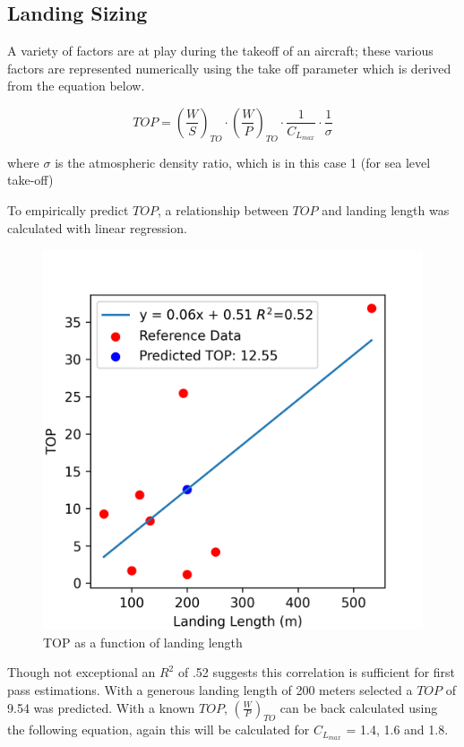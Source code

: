 \documentclass[12pt]{article}
\begin{document}
	\subsection{Landing Sizing}
	A variety of factors are at play during the takeoff of an aircraft; these various factors are represented numerically using the take off parameter which is derived from the equation below.
	
	\begin{equation}
		TOP = \left(\frac{W}{S}\right)_{TO} \cdot \left(\frac{W}{P}\right)_{TO} \cdot \frac{1}{C_{L_{max}}} \cdot \frac{1}{\sigma}
	\end{equation}
	
	where $\sigma$ is the atmospheric density ratio, which is in this case 1 (for sea level take-off) 
	
	To empirically predict $TOP$, a relationship between $TOP$ and landing length was calculated with linear regression.
	
	\begin{figure}[h!]
		\centering
		\includegraphics[width=6in]{Figures/TOP_vs_Landing_Length.png} %
		\caption{TOP as a function of landing length}
		\label{fig:TOPLand}
	\end{figure}
	
	Though not exceptional an $R^2$ of .52 suggests this correlation is sufficient for first pass estimations. With a generous landing length of 200 meters selected a $TOP$ of 9.54 was predicted. With a known $TOP$, $(\frac{W}{P})_{TO}$ can be back calculated using the following equation, again this will be calculated for $C_{L_{max}}$ = 1.4, 1.6 and 1.8.
	
\end{document}
